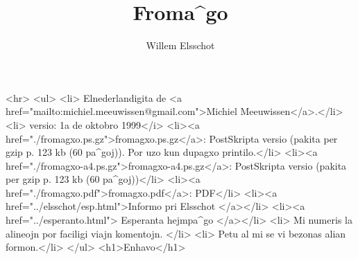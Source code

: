 
\title{Froma^go}
\author{Willem Elsschot}
\date{}

\def\cxapitro#1{\section{#1}}

\def\rrim#1{}
\def\rim#1{}


\def\a#1{}
\def\ax#1#2{}



\maketitle
\begin{rawhtml}
<hr>
<ul>
<li> Elnederlandigita de <a href="mailto:michiel.meeuwissen@gmail.com">Michiel Meeuwissen</a>.</li>
<li> versio: 1a de oktobro 1999</i>
<li><a href="./fromagxo.ps.gz">fromagxo.ps.gz</a>: PostSkripta versio (pakita per gzip p. 123 kb
(60 pa^goj)). Por uzo kun dupagxo printilo.</li>
<li><a href="./fromagxo-a4.ps.gz">fromagxo-a4.ps.gz</a>: PostSkripta versio (pakita per gzip p. 123 kb
(60 pa^goj))</li>
<li><a href="./fromagxo.pdf">fromagxo.pdf</a>: PDF</li>
<li><a href="../elsschot/esp.html">Informo pri Elsschot </a></li>
<li><a href="../esperanto.html"> Esperanta hejmpa^go </a></li>
<li> Mi numeris la alineojn por faciligi viajn komentojn. </li>
<li> Petu al mi se vi bezonas alian formon.</li>
</ul>
<h1>Enhavo</h1>
\end{rawhtml}


























